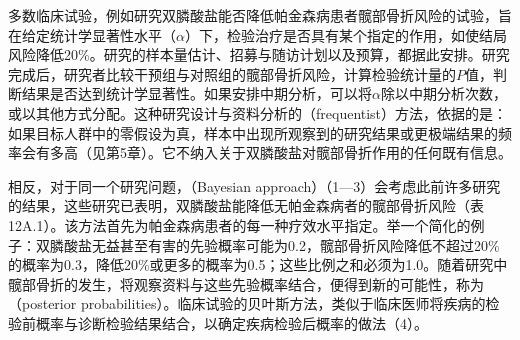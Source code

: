 多数临床试验，例如研究双膦酸盐能否降低帕金森病患者髋部骨折风险的试验，旨在给定统计学显著性水平（$\alpha$）下，检验治疗是否具有某个指定的作用，如使结局风险降低20\%。研究的样本量估计、招募与随访计划以及预算，都据此安排。研究完成后，研究者比较干预组与对照组的髋部骨折风险，计算检验统计量的$P$值，判断结果是否达到统计学显著性。如果安排中期分析，可以将$\alpha$除以中期分析次数，或以其他方式分配。这种研究设计与资料分析的（frequentist）方法，依据的是：如果目标人群中的零假设为真，样本中出现所观察到的研究结果或更极端结果的频率会有多高（见第5章）。它不纳入关于双膦酸盐对髋部骨折作用的任何既有信息。

相反，对于同一个研究问题，（Bayesian approach）（1—3）会考虑此前许多研究的结果，这些研究已表明，双膦酸盐能降低无帕金森病者的髋部骨折风险（表12A.1）。该方法首先为帕金森病患者的每一种疗效水平指定。举一个简化的例子：双膦酸盐无益甚至有害的先验概率可能为0.2，髋部骨折风险降低不超过20\%的概率为0.3，降低20\%或更多的概率为0.5；这些比例之和必须为1.0。随着研究中髋部骨折的发生，将观察资料与这些先验概率结合，便得到新的可能性，称为（posterior probabilities）。临床试验的贝叶斯方法，类似于临床医师将疾病的检验前概率与诊断检验结果结合，以确定疾病检验后概率的做法（4）。

